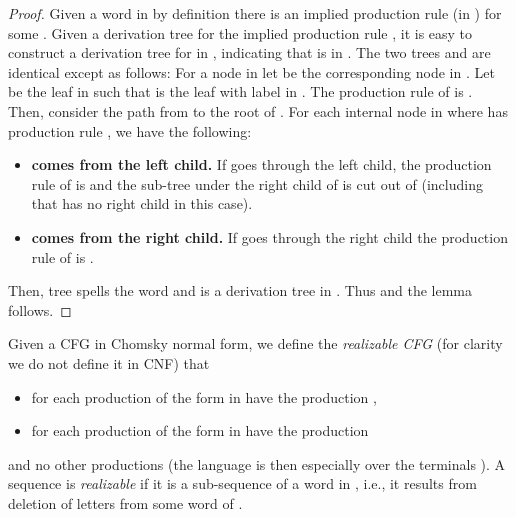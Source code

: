 \documentclass{CSML}
\begin{document}
\begin{proof}
\smallskip{}
Given a word  in  by definition there is an implied production rule  (in ) for some . 
Given a derivation tree  for the implied production rule , 
it is easy to construct a derivation tree  for  in , indicating that  is in . 
The two trees  and  are identical except as follows:
For a node  in  let  be the corresponding node in . 
 Let  be the leaf in  such that  is the leaf with label  in . 
 The production rule of  is . Then, consider the path  from  to the root of . 
 For each internal node  in  where  has production rule , we have the following:
\begin{itemize}
\item  {\bf  comes from the left child.}  If  goes through the left child, the production rule of  is  and the sub-tree under the right child of  is cut out of  (including that  has no right child in this case).
\item {\bf  comes from the right child.} If  goes through the right child the production rule of  is .
\end{itemize} 
Then, tree  spells the word  and is a derivation tree in . Thus  and the lemma follows.
\end{proof}



\smallskip{}
Given a CFG  in Chomsky normal form, we define the {\em realizable CFG }  (for clarity we do not define it in CNF) that 
\begin{itemize}
\item for each production of the form  in  have the production ,
\item for each production of the form  in  have the production 
\end{itemize}
 and no other productions (the language is then especially over the terminals ). 
A sequence is {\em realizable} if it is a sub-sequence of a word in , i.e., it results from deletion of letters from some word of .
\end{document}
